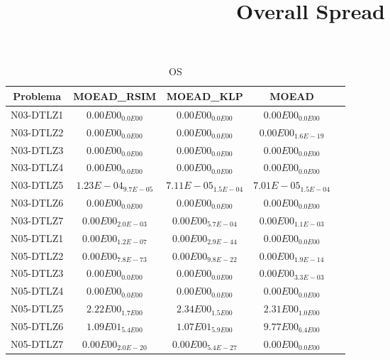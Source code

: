 \documentclass{article}
\title{Overall Spread}
\author{}
\begin{document}
\maketitle
\begin{table*}[ht!]
\scriptsize
\caption{OS}
\centering\begin{tabular}{|c||c||c||c||c|} \hline
Problema &MOEAD_RSIM &MOEAD_KLP &MOEAD\\\hline
N03-DTLZ1 &\cellcolor{gray95}$0.00E00_{0.0E00}$ &\cellcolor{gray25}$0.00E00_{0.0E00}$ &$0.00E00_{0.0E00}$\\ 
\hline
N03-DTLZ2 &\cellcolor{gray95}$0.00E00_{0.0E00}$ &\cellcolor{gray25}$0.00E00_{0.0E00}$ &$0.00E00_{1.6E-19}$\\ 
\hline
N03-DTLZ3 &\cellcolor{gray95}$0.00E00_{0.0E00}$ &\cellcolor{gray25}$0.00E00_{0.0E00}$ &$0.00E00_{0.0E00}$\\ 
\hline
N03-DTLZ4 &\cellcolor{gray95}$0.00E00_{0.0E00}$ &\cellcolor{gray25}$0.00E00_{0.0E00}$ &$0.00E00_{0.0E00}$\\ 
\hline
N03-DTLZ5 &\cellcolor{gray95}$1.23E-04_{9.7E-05}$ &\cellcolor{gray25}$7.11E-05_{1.5E-04}$ &$7.01E-05_{1.5E-04}$\\ 
\hline
N03-DTLZ6 &\cellcolor{gray95}$0.00E00_{0.0E00}$ &\cellcolor{gray25}$0.00E00_{0.0E00}$ &$0.00E00_{0.0E00}$\\ 
\hline
N03-DTLZ7 &$0.00E00_{2.0E-03}$ &\cellcolor{gray95}$0.00E00_{5.7E-04}$ &\cellcolor{gray25}$0.00E00_{1.1E-03}$\\ 
\hline
N05-DTLZ1 &$0.00E00_{1.2E-07}$ &\cellcolor{gray25}$0.00E00_{2.9E-44}$ &\cellcolor{gray95}$0.00E00_{0.0E00}$\\ 
\hline
N05-DTLZ2 &\cellcolor{gray95}$0.00E00_{7.8E-73}$ &\cellcolor{gray25}$0.00E00_{9.8E-22}$ &$0.00E00_{1.9E-14}$\\ 
\hline
N05-DTLZ3 &\cellcolor{gray95}$0.00E00_{0.0E00}$ &\cellcolor{gray25}$0.00E00_{0.0E00}$ &$0.00E00_{3.3E-03}$\\ 
\hline
N05-DTLZ4 &\cellcolor{gray95}$0.00E00_{0.0E00}$ &\cellcolor{gray25}$0.00E00_{0.0E00}$ &$0.00E00_{0.0E00}$\\ 
\hline
N05-DTLZ5 &$2.22E00_{1.7E00}$ &\cellcolor{gray95}$2.34E00_{1.5E00}$ &\cellcolor{gray25}$2.31E00_{1.0E00}$\\ 
\hline
N05-DTLZ6 &\cellcolor{gray95}$1.09E01_{5.4E00}$ &\cellcolor{gray25}$1.07E01_{5.9E00}$ &$9.77E00_{6.4E00}$\\ 
\hline
N05-DTLZ7 &$0.00E00_{2.0E-20}$ &\cellcolor{gray25}$0.00E00_{5.4E-27}$ &\cellcolor{gray95}$0.00E00_{0.0E00}$\\ 

\end{tabular}
\end{table*}
\end{document}
